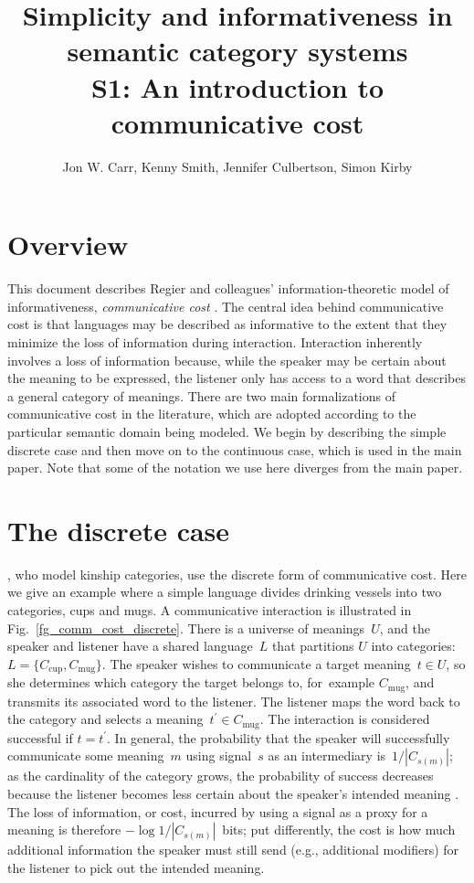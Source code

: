 \documentclass[a4paper, 11pt]{article}
\title{Simplicity and informativeness in semantic category systems \\ S1: An introduction to communicative cost}
\author{Jon W. Carr, Kenny Smith, Jennifer Culbertson, Simon Kirby}
\date{}
\begin{document}
\maketitle

\section{Overview}

This document describes Regier and colleagues' information-theoretic model of informativeness, \textit{communicative cost} \citep[see also][]{Regier:2015,Kemp:2018}. The central idea behind communicative cost is that languages may be described as informative to the extent that they minimize the loss of information during interaction. Interaction inherently involves a loss of information because, while the speaker may be certain about the meaning to be expressed, the listener only has access to a word that describes a general category of meanings. There are two main formalizations of communicative cost in the literature, which are adopted according to the particular semantic domain being modeled. We begin by describing the simple discrete case and then move on to the continuous case, which is used in the main paper. Note that some of the notation we use here diverges from the main paper.

\section{The discrete case}

\citet{KempRegier:2012}, who model kinship categories, use the discrete form of communicative cost. Here we give an example where a simple language divides drinking vessels into two categories, cups and mugs. A communicative interaction is illustrated in Fig.~\ref{fg_comm_cost_discrete}. There is a universe of meanings~$U$, and the speaker and listener have a shared language~$L$ that partitions $U$ into categories: $L = \{C_\mathrm{cup}, C_\mathrm{mug}\}$. The speaker wishes to communicate a target meaning~$t \in U$, so she determines which category the target belongs to, for~example $C_\mathrm{mug}$, and transmits its associated word to the listener. The listener maps the word back to the category and selects a meaning~$t^\prime \in C_\mathrm{mug}$. The interaction is considered successful if $t = t^\prime$. In general, the probability that the speaker will successfully communicate some meaning~$m$ using signal~$s$ as an intermediary is~$1/|C_{s(m)}|$; as the cardinality of the category grows, the probability of success decreases because the listener becomes less certain about the speaker's intended meaning \citep[cf.\@ the size principle;][]{Tenenbaum:2001,Xu:2007}. The loss of information, or cost, incurred by using a signal as a proxy for a meaning is therefore $-\log 1 / |C_{s(m)}|$~bits; put differently, the cost is how much additional information the speaker must still send (e.g., additional modifiers) for the listener to pick out the intended meaning.
\end{document}
